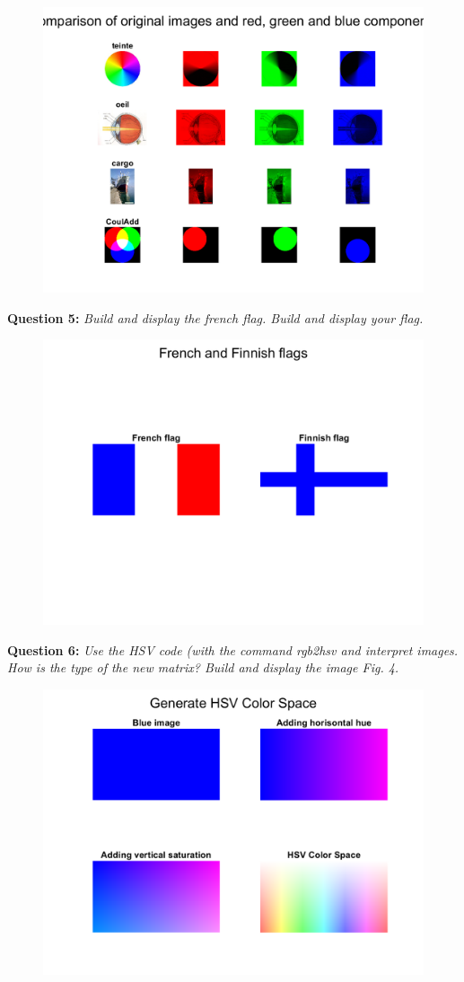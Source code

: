 \begin{figure}[H]
    \centering
    \includegraphics[width=\linewidth]{Doc/Graphics/Part1_Question4a.png}
    \label{fig:enter-label}
\end{figure}



\textbf{Question 5:}
\textit{Build and display the french ﬂag. Build and display your ﬂag.}

\begin{figure}[H]
    \centering
    \includegraphics[width=0.5\linewidth]{Doc/Graphics/Part1_Question5.png}
    \label{fig:enter-label}
\end{figure}



\textbf{Question 6:}
\textit{Use the HSV code (with the command rgb2hsv and interpret images. How is the type of the new matrix? Build and display the image Fig. 4.}

\begin{figure}[H]
    \centering
    \includegraphics[width=0.75\linewidth]{Doc/Graphics/Part1_Question6a.png}
    \label{fig:enter-label}
\end{figure}

